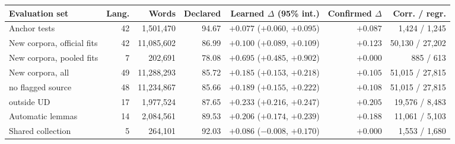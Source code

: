 \begin{tabular*}{\textwidth}{@{\extracolsep{\fill}}lrrrrrr@{}}
\toprule Evaluation set & Lang. & Words & Declared & Learned $\Delta$ (95\% int.) & Confirmed $\Delta$ & Corr. / regr. \\\midrule
Anchor tests & 42 & 1,501,470 & 94.67 & $+0.077$ ($+0.060$, $+0.095$) & $+0.087$ & 1,424 / 1,245 \\
\midrule
New corpora, official fits & 42 & 11,085,602 & 86.99 & $+0.100$ ($+0.089$, $+0.109$) & $+0.123$ & 50,130 / 27,202 \\
New corpora, pooled fits & 7 & 202,691 & 78.08 & $+0.695$ ($+0.485$, $+0.902$) & $+0.000$ & 885 / 613 \\
New corpora, all & 49 & 11,288,293 & 85.72 & $+0.185$ ($+0.153$, $+0.218$) & $+0.105$ & 51,015 / 27,815 \\
\quad no flagged source & 48 & 11,234,867 & 85.66 & $+0.189$ ($+0.155$, $+0.222$) & $+0.108$ & 51,015 / 27,815 \\
\quad outside UD & 17 & 1,977,524 & 87.65 & $+0.233$ ($+0.216$, $+0.247$) & $+0.205$ & 19,576 / 8,483 \\
\midrule
Automatic lemmas & 14 & 2,084,561 & 89.53 & $+0.206$ ($+0.174$, $+0.239$) & $+0.188$ & 11,061 / 5,103 \\
Shared collection & 5 & 264,101 & 92.03 & $+0.086$ ($-0.008$, $+0.170$) & $+0.000$ & 1,553 / 1,680 \\
\bottomrule\end{tabular*}
